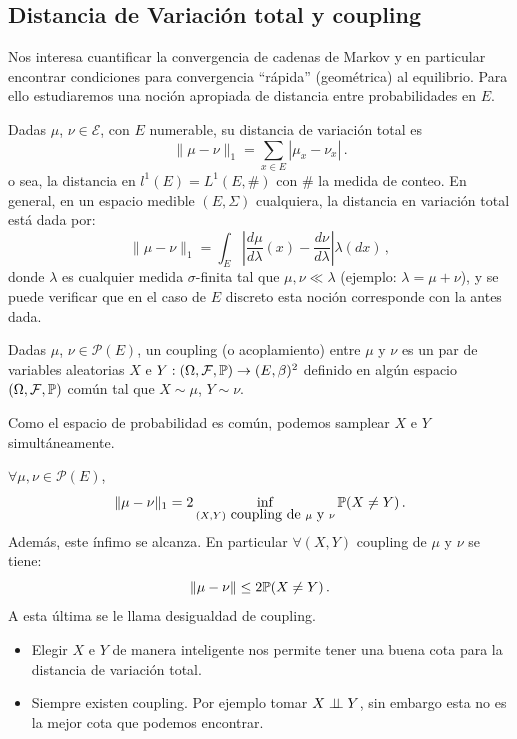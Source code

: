 \subsection{Distancia de Variación total y coupling }
Nos interesa cuantificar la convergencia de cadenas de Markov y en particular encontrar condiciones para convergencia ``rápida'' (geométrica) al equilibrio. Para ello  estudiaremos una noci\'on apropiada de distancia entre probabilidades en $E$.
\begin{definition}
\label{def:var_tot}
Dadas $\mu$, $\nu\in\mathcal{E}$, con $E$ numerable, su distancia de variación total es $$\|\mu-\nu\|_1=\sum_{x\in E}|\mu_x-\nu_x| \, .$$
o sea, la distancia en $l^1(E)=L^1(E,\#)$ con $\#$ la medida de conteo.
\newline En general, en un espacio medible $(E,\Sigma)$ cualquiera, la distancia en variación total está dada por:
$$ \|\mu-\nu\|_1=\displaystyle\int_E|\frac{d\mu}{d\lambda}(x)-\frac{d\nu}{d\lambda}|\lambda(dx) \, ,$$
donde $\lambda$ es cualquier medida $\sigma$-finita tal que $\mu,\nu \ll \lambda$ (ejemplo: $\lambda=\mu+\nu$), y se puede verificar que en el caso de $E$ discreto esta noci\'on corresponde con la antes dada. 
\end{definition}
\begin{definition}[Coupling]
Dadas $\mu$, $\nu\in\mathcal{P}(E)$, un coupling (o acoplamiento) entre $\mu$ y $\nu$ es un par de variables aleatorias $X$ e $Y:\edp\to(E,\beta)^2$ definido en algún espacio $\edp$ común tal que $X\sim\mu$, $Y\sim\nu$.
\end{definition}
\begin{remark}
Como el espacio de probabilidad es común, podemos samplear $X$ e $Y$ simultáneamente.
\end{remark}
\begin{lemma}
\label{lemma:des_coup}
$\forall\mu,\nu\in\mathcal{P}(E)$,
$$ \|\mu-\nu\|_1 = \displaystyle 2\inf_{(X,Y) \mbox{ coupling de }\mu\mbox{ y }\nu}\P(X\neq Y)\, .$$
Además, este ínfimo se alcanza. En particular $\forall (X,Y)$ coupling de $\mu$ y $\nu$ se tiene:
$$ \|\mu-\nu\|\leq 2\P(X\neq Y) \, .$$
A esta última se le llama desigualdad de coupling. 
\end{lemma}
\begin{remark}
\beforeitemize
\begin{itemize}
    \item Elegir $X$ e $Y$ de manera inteligente nos permite tener una buena cota para la distancia de variación total.
    \item Siempre existen coupling. Por ejemplo tomar $X\indep Y$, sin embargo esta no es la mejor cota que podemos encontrar.
\end{itemize}
\end{remark}

